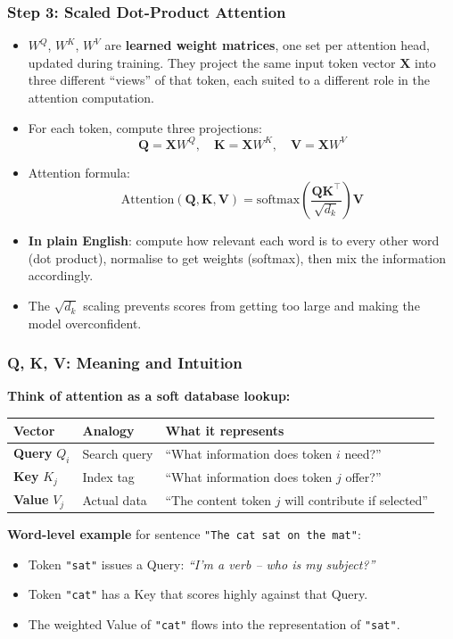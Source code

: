 \begin{frame}[fragile]\frametitle{Step 3: Scaled Dot-Product Attention}
\begin{itemize}
\item $W^Q$, $W^K$, $W^V$ are \textbf{learned weight matrices},
  one set per attention head, updated during training. They project
  the same input token vector $\mathbf{X}$ into three different
  ``views'' of that token, each suited to a different role in the
  attention computation.
\item For each token, compute three projections:
\[
  \mathbf{Q} = \mathbf{X}W^Q, \quad \mathbf{K} = \mathbf{X}W^K, \quad \mathbf{V} = \mathbf{X}W^V
\]
\item Attention formula:
\[
  \text{Attention}(\mathbf{Q}, \mathbf{K}, \mathbf{V}) 
    = \text{softmax}\!\left(\frac{\mathbf{Q}\mathbf{K}^\top}{\sqrt{d_k}}\right)\mathbf{V}
\]
\item \textbf{In plain English}: compute how relevant each word is to every other word (dot product), normalise to get weights (softmax), then mix the information accordingly.
\item The $\sqrt{d_k}$ scaling prevents scores from getting too large and making the model overconfident.
\end{itemize}
\end{frame}

\begin{frame}[fragile]\frametitle{Q, K, V: Meaning and Intuition}
\textbf{Think of attention as a soft database lookup:}
\begin{center}
\small
\renewcommand{\arraystretch}{1.3}
\begin{tabular}{|l|l|p{5.5cm}|}
\hline
\textbf{Vector} & \textbf{Analogy} & \textbf{What it represents} \\
\hline
\textbf{Query} $Q_i$ & Search query & ``What information does token $i$ need?'' \\
\hline
\textbf{Key}   $K_j$ & Index tag    & ``What information does token $j$ offer?'' \\
\hline
\textbf{Value} $V_j$ & Actual data  & ``The content token $j$ will contribute if selected'' \\
\hline
\end{tabular}
\end{center}
\vspace{0.3em}
\textbf{Word-level example} for sentence \texttt{"The cat sat on the mat"}:
\begin{itemize}
\item Token \texttt{"sat"} issues a Query: \textit{``I'm a verb – who is my subject?''}
\item Token \texttt{"cat"} has a Key that scores highly against that Query.
\item The weighted Value of \texttt{"cat"} flows into the representation of \texttt{"sat"}.
\end{itemize}
\end{frame}

